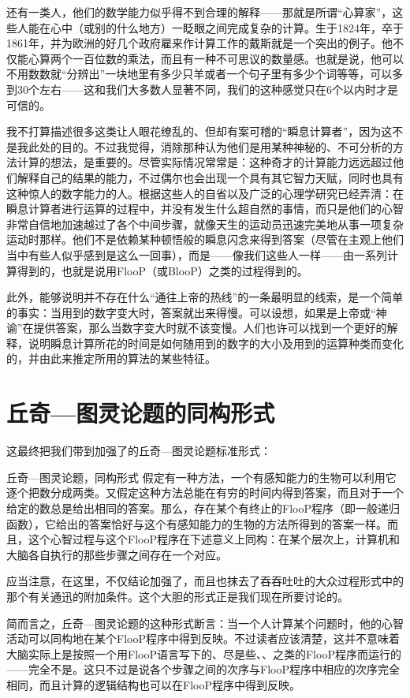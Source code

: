 还有一类人，他们的数学能力似乎得不到合理的解释——那就是所谓“心算家”，这些人能在心中（或别的什么地方）一眨眼之间完成复杂的计算。生于1824年，卒于1861年，并为欧洲的好几个政府雇来作计算工作的戴斯就是一个突出的例子。他不仅能心算两个一百位数的乘法，而且有一种不可思议的数量感。也就是说，他可以不用数数就“分辨出”一块地里有多少只羊或者一个句子里有多少个词等等，可以多到$30$个左右——这和我们大多数人显著不同，我们的这种感觉只在$6$个以内时才是可信的。

我不打算描述很多这类让人眼花缭乱的、但却有案可稽的“瞬息计算者”，因为这不是我此处的目的。不过我觉得，消除那种认为他们是用某种神秘的、不可分析的方法计算的想法，是重要的。尽管实际情况常常是：这种奇才的计算能力远远超过他们解释自己的结果的能力，不过偶尔也会出现一个具有其它智力天赋，同时也具有这种惊人的数字能力的人。根据这些人的自省以及广泛的心理学研究已经弄清：在瞬息计算者进行运算的过程中，并没有发生什么超自然的事情，而只是他们的心智非常自信地加速越过了各个中间步骤，就像天生的运动员迅速完美地从事一项复杂运动时那样。他们不是依赖某种顿悟般的瞬息闪念来得到答案（尽管在主观上他们当中有些人似乎感到是这么一回事），而是——像我们这些人一样——由一系列计算得到的，也就是说用FlooP（或BlooP）之类的过程得到的。

此外，能够说明并不存在什么“通往上帝的热线”的一条最明显的线索，是一个简单的事实：当用到的数字变大时，答案就出来得慢。可以设想，如果是上帝或“神谕”在提供答案，那么当数字变大时就不该变慢。人们也许可以找到一个更好的解释，说明瞬息计算所花的时间是如何随用到的数字的大小及用到的运算种类而变化的，并由此来推定所用的算法的某些特征。

\section{丘奇—图灵论题的同构形式}

这最终把我们带到加强了的丘奇—图灵论题标准形式：

\begin{thm}[2\ccwd]{丘奇—图灵论题，同构形式}
假定有一种方法，一个有感知能力的生物可以利用它逐个把数分成两类。又假定这种方法总能在有穷的时间内得到答案，而且对于一个给定的数总是给出相同的答案。那么，存在某个有终止的FlooP程序（即一般递归函数），它给出的答案恰好与这个有感知能力的生物的方法所得到的答案一样。而且，这个心智过程与这个FlooP程序在下述意义上同构：在某个层次上，计算机和大脑各自执行的那些步骤之间存在一个对应。
\end{thm}
应当注意，在这里，不仅结论加强了，而且也抹去了吞吞吐吐的大众过程形式中的那个有关通迅的附加条件。这个大胆的形式正是我们现在所要讨论的。

简而言之，丘奇—图灵论题的这种形式断言：当一个人计算某个问题时，他的心智活动可以同构地在某个FlooP程序中得到反映。不过读者应该清楚，这并不意味着大脑实际上是按照一个用FlooP语言写下的、尽是些、、之类的FlooP程序而运行的——完全不是。这只不过是说各个步骤之间的次序与FlooP程序中相应的次序完全相同，而且计算的逻辑结构也可以在FlooP程序中得到反映。


